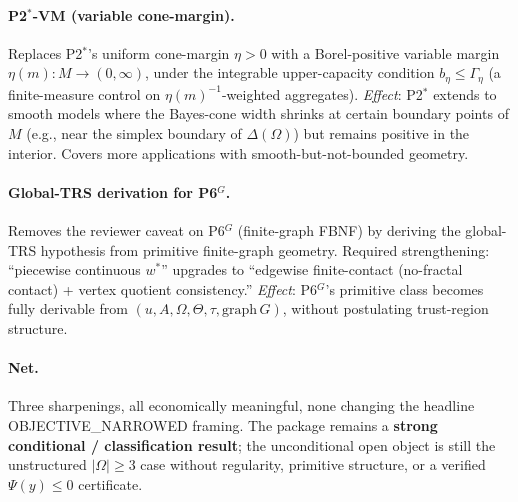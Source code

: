 \documentclass[11pt]{article}
\theoremstyle{definition}
\theoremstyle{remark}
\begin{document}
\paragraph{P2$^*$-VM (variable cone-margin).}
Replaces P2$^*$'s uniform cone-margin $\eta > 0$ with a Borel-positive
variable margin $\eta(m): M \to (0, \infty)$, under the integrable
upper-capacity condition $b_\eta \le \Gamma_\eta$ (a finite-measure
control on $\eta(m)^{-1}$-weighted aggregates).
\emph{Effect}: P2$^*$ extends to smooth models where the Bayes-cone
width shrinks at certain boundary points of $M$ (e.g., near the
simplex boundary of $\Delta(\Omega)$) but remains positive in the
interior. Covers more applications with smooth-but-not-bounded
geometry.

\paragraph{Global-TRS derivation for P6$^G$.}
Removes the reviewer caveat on P6$^G$ (finite-graph FBNF) by deriving
the global-TRS hypothesis from primitive finite-graph geometry.
Required strengthening: ``piecewise continuous $w^*$'' upgrades to
``edgewise finite-contact (no-fractal contact) + vertex quotient
consistency.''
\emph{Effect}: P6$^G$'s primitive class becomes fully derivable from
$(u, A, \Omega, \Theta, \tau, \text{graph}\,G)$, without postulating
trust-region structure.

\paragraph{Net.} Three sharpenings, all economically meaningful, none
changing the headline OBJECTIVE\_NARROWED framing. The package
remains a \textbf{strong conditional / classification result}; the
unconditional open object is still the unstructured $|\Omega| \ge 3$
case without regularity, primitive structure, or a verified
$\Psi(y) \le 0$ certificate.
\end{document}
